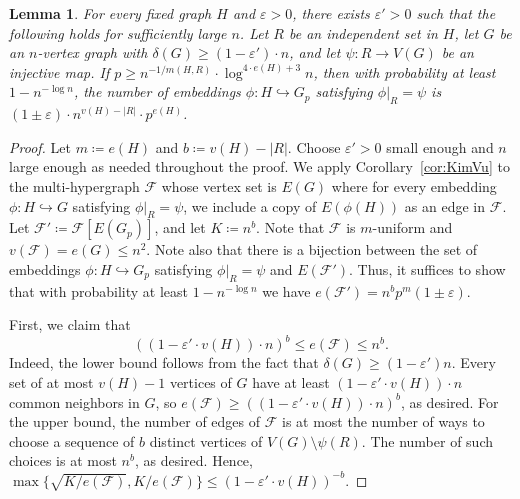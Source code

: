 \documentclass[11pt]{article}
\numberwithin{equation}{section}
\newcommand{\eps}{\varepsilon}
\newcounter{i}
\theoremstyle{plain}
\newtheorem{lem}[thm]{Lemma}
\theoremstyle{plain} %
\theoremstyle{definition}
\newcommand{\cF}{\mathcal{F}}
\begin{document}
\begin{lem}\label{lem:NumberOfEmbeddings}
    For every fixed graph $H$ and $\eps > 0$, there exists $\eps' > 0$ such that the following holds for sufficiently large $n$.  Let $R$ be an independent set in $H$, let $G$ be an $n$-vertex graph with $\delta(G) \geq (1 -\eps')\cdot n$, and let $\psi : R \rightarrow V(G)$ be an injective map.  If $p \geq n^{-1/m(H,R)}\cdot \log^{4\cdot e(H)+3}n$, then with probability at least $1 - n^{-\log n}$, the number of embeddings $\phi : H \hookrightarrow G_p$ satisfying $\phi|_{R} = \psi$ is $(1 \pm \eps)\cdot n^{v(H) - |R|}\cdot p^{e(H)}$.
\end{lem}
\begin{proof}
Let $m \coloneqq e(H)$ and $b \coloneqq v(H) - |R|$.
Choose $\varepsilon' > 0$ small enough and $n$ large enough as needed throughout the proof.  We apply Corollary~\ref{cor:KimVu} to the multi-hypergraph $\cF$  whose vertex set is $E(G)$ where for every embedding $\phi : H \hookrightarrow G$ satisfying $\phi|_R = \psi$, we include a copy of $E(\phi(H))$ as an edge in $\cF$. 
Let $\cF' \coloneqq \cF[E(G_p)]$, and let $K \coloneqq n^b$.
Note that $\cF$ is $m$-uniform and $v(\cF) = e(G) \leq n^2$.
Note also that there is a bijection between the set of embeddings $\phi : H \hookrightarrow G_p$ satisfying $\phi|_R = \psi$ and $E(\cF')$.  Thus, it suffices to show that with probability at least $1 - n^{-\log n}$ we have $e(\cF') = n^b p^m (1 \pm \eps)$.  %

First, we claim that
\begin{equation*}
    \left((1 - \eps'\cdot v(H))\cdot n\right)^b \leq e(\cF) \leq n^b.
\end{equation*}
Indeed, the lower bound follows from the fact that $\delta(G) \geq (1 - \eps')n$.  Every set of at most $v(H) - 1$ vertices of $G$ have at least $(1 - \eps'\cdot v(H))\cdot n$ common neighbors in $G$, so $e(\cF) \geq \left((1 - \eps'\cdot v(H))\cdot n\right)^b$, as desired.
For the upper bound, the number of edges of $\cF$ is at most the number of ways to choose a sequence of $b$ distinct vertices of $V(G) \setminus \psi(R)$. The number of such choices is at most $n^b$, as desired.
Hence, $\max\{\sqrt{K / e(\cF)}, K / e(\cF)\} \leq (1 - \eps'\cdot v(H))^{-b}$.





\end{proof}
\end{document}
